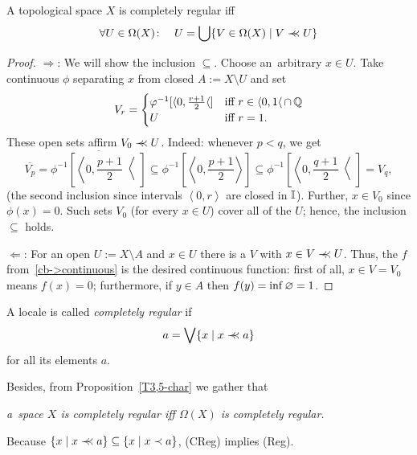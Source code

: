 \begin{prop} \label{T3,5-char}
  A topological space $X$ is completely regular iff
  \[
    \forall U\in \Omega(X)\colon \quad U = \bigcup\{V\in \Omega(X) \mid V \prec\mkern-8mu\prec
    U\}
  \]
\end{prop}
\begin{proof}
  $\Rightarrow$:
  We will show the inclusion $\subseteq$. 
  Choose an~arbitrary $x\in U$.
  Take continuous $\phi$ separating $x$ from closed $A := X\setminus U$ and set
  \[
  V_r =
  \begin{cases}
    \varphi^{-1}[\langle 0, \frac{r+1}{2} \langle] &\mbox{iff } r\in \langle 0, 1
    \langle \, \cap \, \mathbb{Q}  \\
    U                                   &\mbox{iff } r = 1.
  \end{cases}
  \]
  These open sets affirm $V_0 \prec\mkern-8mu\prec U$.
  Indeed: 
  whenever $p < q$, we get
  \[
    \overline{V_p}
    = \overline{\phi^{-1}\left[ \left\langle 0, \frac{p+1}{2} \right\langle \right]}
    \subseteq \phi^{-1}\left[ \left\langle 0, \frac{p+1}{2} \right\rangle \right]
    \subseteq \phi^{-1}\left[ \left\langle 0, \frac{q+1}{2} \right\langle \right]
    = V_q,
  \]
  (the second inclusion since intervals $\left\langle 0, r \right\rangle$ are
  closed in $\mathbb{I}$).
  Further, $x\in V_0$ since $\phi(x) = 0$.
  Such sets $V_0$ (for every $x\in U$) cover all of the $U$; hence, the
  inclusion $\subseteq$ holds.

  $\Leftarrow$:
  For an open $U := X\setminus A$ and $x\in U$ there is a $V$ with $x\in V \prec\mkern-8mu\prec U$.
  Thus, the $f$ from~\ref{cb->continuous} is the desired continuous function:
  first of all, $x\in V = V_0$ means $f(x) = 0$;
  furthermore, if $y\in A$ then $f(y) = \inf \varnothing = 1$.
\end{proof}

\begin{framed}
  \begin{df}[CReg]
    A locale is called \emph{completely regular\/} if
    \[
      a = \bigvee \{x \mid x \prec\mkern-8mu\prec a\}
    \]
    for all its elements $a$.
  \end{df}
\end{framed}

Besides, from Proposition~\ref{T3,5-char} we gather that
\begin{center}
  \emph{a~space $X$ is completely regular iff $\Omega(X)$ is completely
  regular.\/}
\end{center}

\begin{rem}
  Because $\{x \mid x \prec\mkern-8mu\prec a\}\subseteq \{x \mid x \prec a\}$, (CReg) implies (Reg).
\end{rem}

